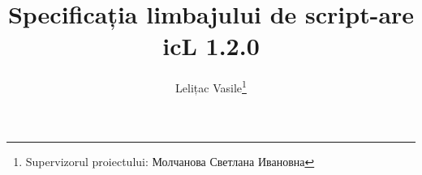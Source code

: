 \documentclass[a4paper, 12pt]{extarticle}
\begin{document}



\title{Specificația limbajului de script-are icL 1.2.0}
\author{Lelițac Vasile\thanks{Supervizorul proiectului: Молчанова Светлана Ивановна}}




\renewcommand{\contentsname}{\textsf{Cuprins}}\makeatletter
\renewcommand{\l@section}{\@dottedtocline{1}{1.5em}{2.6em}}
\renewcommand{\l@subsection}{\@dottedtocline{2}{4.0em}{3.6em}}
\renewcommand{\l@subsubsection}{\@dottedtocline{3}{7.4em}{4.5em}}
\makeatother
\tableofcontents

\end{document}
